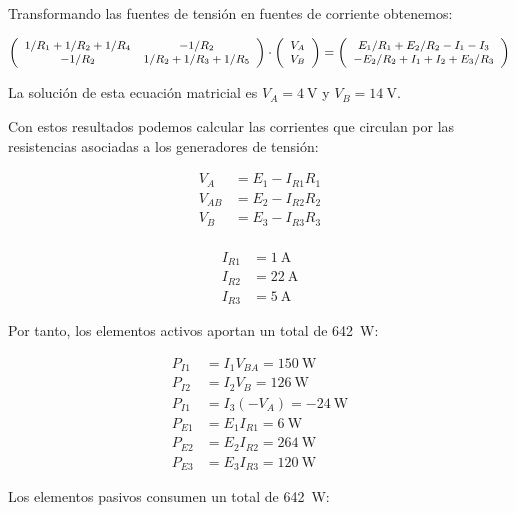 \documentclass[10pt]{article}
\begin{document}
Transformando las fuentes de tensión en fuentes de corriente obtenemos:

\[
\small{
\left(\begin{array}{ccc}
    1/R_1 + 1/R_2 + 1/R_4 & -1/R_2\\
    -1/R_2 & 1/R_2 + 1/R_3 + 1/R_5
  \end{array}\right) \cdot \left(\begin{array}{c}
    V_{A}\\
    V_{B}
  \end{array}\right) = 
\left(\begin{array}{c}
        E_1/R_1 + E_2/R_2 - I_1 - I_3\\
        -E_2/R_2 + I_1 + I_2 + E_3/R_3
      \end{array}\right)
  }
\]

La solución de esta ecuación matricial es $V_A = \SI{4}{\volt}$ y $V_B = \SI{14}{\volt}$. 

Con estos resultados podemos calcular las corrientes que circulan por las resistencias asociadas a los generadores de tensión:

\begin{align*}
V_A &= E_1 - I_{R1} R_1\\
V_{AB} &= E_2 - I_{R2} R_2\\
V_B &= E_3 - I_{R3} R_3\\
\end{align*}

\begin{align*}
I_{R1} &= \SI{1}{\ampere}\\
I_{R2} &= \SI{22}{\ampere}\\
I_{R3} &= \SI{5}{\ampere}
\end{align*}

Por tanto, los elementos activos aportan un total de \SI{642}{\watt}:

\begin{align*}
P_{I1} &= I_1 V_{BA} = \SI{150}{\watt}\\
P_{I2} &= I_2 V_{B} = \SI{126}{\watt}\\
P_{I1} &= I_3 (-V_{A}) = - \SI{24}{\watt}\\
P_{E1} &= E_1 I_{R1} = \SI{6}{\watt}\\
P_{E2} &= E_2 I_{R2} = \SI{264}{\watt}\\
P_{E3} &= E_3 I_{R3} = \SI{120}{\watt}
\end{align*}

Los elementos pasivos consumen un total de \SI{642}{\watt}:
\end{document}
